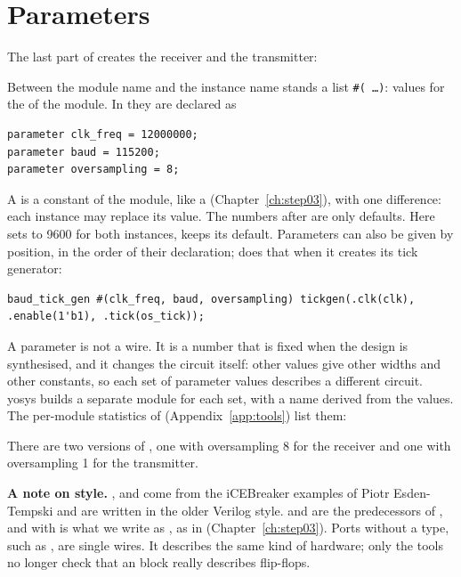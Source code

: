 \section{Parameters}
\label{sec:step06-parameter}

The last part of  creates the receiver and the transmitter:


Between the module name and the instance name stands a list
\texttt{\#(\,\dots)}: values for the  of the module. In
 they are declared as
\begin{lstlisting}
parameter clk_freq = 12000000;
parameter baud = 115200;
parameter oversampling = 8;
\end{lstlisting}
A  is a constant of the module, like a 
(Chapter~\ref{ch:step03}), with one difference: each instance may replace its
value. The numbers after \cc{=} are only defaults. Here  sets
 to 9600 for both instances,  keeps its default.
Parameters can also be given by position, in the order of their declaration;
 does that when it creates its tick generator:
\begin{lstlisting}
baud_tick_gen #(clk_freq, baud, oversampling) tickgen(.clk(clk), .enable(1'b1), .tick(os_tick));
\end{lstlisting}

A parameter is not a wire. It is a number that is fixed when the design is
synthesised, and it changes the circuit itself: other values give other
widths and other constants, so each set of parameter values describes a
different circuit. yosys builds a separate module for each set, with a name
derived from the values. The per-module statistics of 
(Appendix~\ref{app:tools}) list them:


There are two versions of , one with oversampling 8 for the
receiver and one with oversampling 1 for the transmitter.

\textbf{A note on style.} ,  and  come from the
iCEBreaker examples of Piotr Esden-Tempski and are written in the older
Verilog style.  and  are the predecessors of , and
 with \cc{<=} is what we write as , as
in  (Chapter~\ref{ch:step03}). Ports without a type, such as
, are single wires. It describes the same kind of hardware; only
the tools no longer check that an  block really describes
flip-flops.

